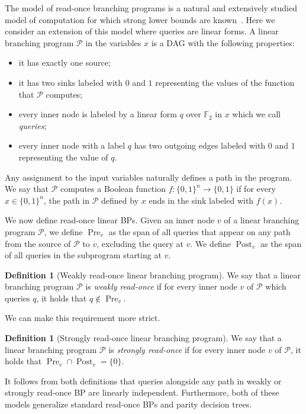\documentclass[10pt,a4paper]{article}
\theoremstyle{definition}
\newtheorem{definition}[theorem]{Definition}
\theoremstyle{remark}
\DeclareMathOperator{\pre}{Pre}
\DeclareMathOperator{\post}{Post}
\newcommand{\Q}{{\{0,1\}}}
\newcommand{\bbF}{\mathbb{F}}
\newcommand{\calP}{\mathcal{P}}
\newcommand{\sreadonce}{strongly read-once}
\newcommand{\Sreadonce}{Strongly read-once}
\newcommand{\wreadonce}{weakly read-once}
\newcommand{\Wreadonce}{Weakly read-once}
\newcommand{\readonce}{read-once}
\begin{document}
The model of read-once branching programs is a natural and extensively studied model of computation for which strong lower bounds are known~\cite{DBLP:journals/tcs/SavickyZ00,DBLP:conf/icalp/AndreevBCR99}. Here we consider an extension of this model where queries are linear forms. A linear branching program $\calP$ in the variables $x$ is a DAG with the following properties:
\begin{itemize}
  \item it has exactly one source;
  \item it has two sinks labeled with $0$ and $1$ representing the values of the function that $\calP$ computes;
  \item every inner node is labeled by a linear form $q$ over $\bbF_2$ in $x$ which we call \emph{queries};
  \item every inner node with a label $q$ has two outgoing edges labeled with $0$ and $1$ representing the value of $q$.
\end{itemize}

Any assignment to the input variables naturally defines a path in the program. We say that $\calP$ computes a Boolean function $f\colon \Q^n \to \Q$ if for every $x \in \Q^n$, the path in $\calP$ defined by $x$ ends in the sink labeled with $f(x)$.

We now define \readonce{} linear BPs. Given an inner node $v$ of a linear branching program $\calP$, we define $\pre_v$ as the span of all queries that appear on any path from the source of $\calP$ to $v$, excluding the query at $v$. We define $\post_v$ as the span of all queries in the subprogram starting at $v$. 

\begin{definition}[\Wreadonce{} linear branching program]
We say that a linear branching program $\calP$ is \emph{\wreadonce} if for every inner node $v$ of $\calP$ which queries $q$, it holds that $q \not \in \pre_v$.
\end{definition}

We can make this requirement more strict.

\begin{definition}[\Sreadonce{} linear branching program]
We say that a linear branching program $\calP$ is \emph{\sreadonce} if for every inner node $v$ of $\calP$, it holds that $\pre_v \cap \post_v = \{0\}$.
\end{definition}

It follows from both definitions that queries alongside any path in weakly or strongly read-once BP are linearly independent. Furthermore, both of these models generalize standard read-once BPs and parity decision trees.
\end{document}
